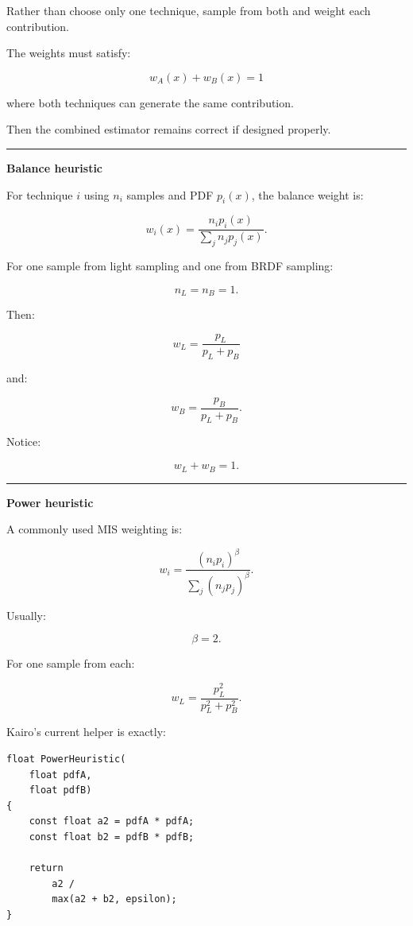 Rather than choose only one technique, sample from both and weight each contribution.

The weights must satisfy:

\[
\boxed{
w_A(x)+w_B(x)=1
}
\]

where both techniques can generate the same contribution.

Then the combined estimator remains correct if designed properly.

\begin{center}\rule{0.5\linewidth}{0.5pt}\end{center}

\textbf{Balance heuristic}

For technique \(i\) using \(n_i\) samples and PDF \(p_i(x)\), the balance weight is:

\[
\boxed{
w_i(x)
=
\frac{
n_i p_i(x)
}{
\sum_j n_jp_j(x)
}.
}
\]

For one sample from light sampling and one from BRDF sampling:

\[
n_L=n_B=1.
\]

Then:

\[
\boxed{
w_L
=
\frac{
p_L
}{
p_L+p_B
}
}
\]

and:

\[
\boxed{
w_B
=
\frac{
p_B
}{
p_L+p_B
}.
}
\]

Notice:

\[
w_L+w_B=1.
\]

\begin{center}\rule{0.5\linewidth}{0.5pt}\end{center}

\textbf{Power heuristic}

A commonly used MIS weighting is:

\[
\boxed{
w_i
=
\frac{
(n_ip_i)^\beta
}{
\sum_j(n_jp_j)^\beta
}.
}
\]

Usually:

\[
\beta=2.
\]

For one sample from each:

\[
\boxed{
w_L
=
\frac{
p_L^2
}{
p_L^2+p_B^2
}.
}
\]

Kairo's current helper is exactly:

\begin{verbatim}
float PowerHeuristic(
    float pdfA,
    float pdfB)
{
    const float a2 = pdfA * pdfA;
    const float b2 = pdfB * pdfB;

    return
        a2 /
        max(a2 + b2, epsilon);
}
\end{verbatim}

